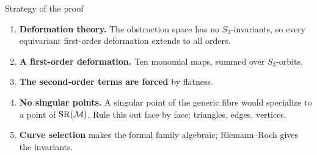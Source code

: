 \begin{frame}{Strategy of the proof}
\begin{enumerate}
\setlength{\itemsep}{10pt}
\item \textbf{Deformation theory.} The obstruction space has no \(S_3\)-invariants, so every equivariant first-order deformation extends to all orders.
\item \textbf{A first-order deformation.} Ten monomial maps, summed over \(S_3\)-orbits.
\item \textbf{The second-order terms are forced} by flatness.
\item \textbf{No singular points.} A singular point of the generic fibre would specialize to a point of \(\operatorname{SR}(\mathcal M)\). Rule this out face by face: triangles, edges, vertices.
\item \textbf{Curve selection} makes the formal family algebraic; Riemann--Roch gives the invariants.
\end{enumerate}
\end{frame}

